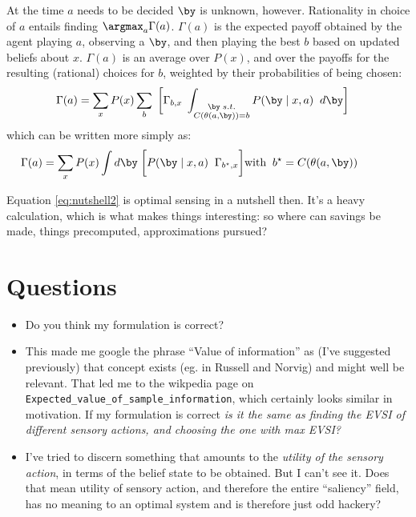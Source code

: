 \documentclass[11pt]{article}
\begin{document}
At the time $a$ needs to be decided $\by$ is unknown, however.
Rationality in choice of $a$ entails finding $\argmax_{a}
\Gamma(a)$.  $\Gamma(a)$ is the expected payoff obtained by the agent
playing $a$, observing a $\by$, and then playing the best $b$
based on updated beliefs about $x$. $\Gamma(a)$ is an average over
$P(x)$, and over the payoffs for the resulting (rational) choices for
$b$, weighted by their probabilities of being chosen:
\begin{align*}
\Gamma(a) &= 
\sum_x P(x) 
\sum_b \; \bigg[ \Gamma_{b,x}
\;
\int_{\substack{\by \; s.t. \\ C(\theta(a,\by)) =b}} 
 P(\by \mid x,a)  \;\; d\by 
\bigg]
\end{align*}
which can be written more simply as:
\begin{equation}
\label{eq:nutshell2} 
\Gamma(a) = 
\sum_x P(x) 
\int d\by \;
\bigg[ P(\by \mid x,a)  \;\;
\Gamma_{b^\star,x} \bigg] 
\hfill \text{with} \;\;b^\star = C(\theta(a,\by)) \;\;\;\; \;\;\;\; \;\;\;\;
\end{equation}

Equation \ref{eq:nutshell2} is optimal sensing in a nutshell then.
It's a heavy calculation, which is what makes things interesting: so
where can savings be made, things precomputed, approximations pursued?

\newpage
\section{Questions}


\begin{itemize}
\item  Do you think my formulation is correct?

\item This made me google the phrase ``Value of information'' as (I've
  suggested previously) that concept exists (eg. in Russell and
  Norvig) and might well be relevant. That led me to the wikpedia page
  on {\tt Expected\_value\_of\_sample\_information}, which certainly
  looks similar in motivation.  If my formulation is correct {\it is
    it the same as finding the EVSI of different sensory actions, and
    choosing the one with max EVSI?}

\item I've tried to discern something that amounts to the \emph{utility of
  the sensory action}, in terms of the belief state to be
  obtained. But I can't see it. Does that mean utility of sensory
action, and therefore the entire ``saliency'' field, has no meaning to
an optimal system and is therefore just odd hackery?

\end{itemize}
\end{document}
